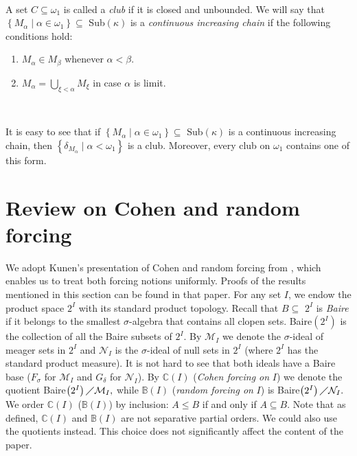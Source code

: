 \documentclass{article}%
\begin{document}
\qquad\qquad\qquad\ \ \qquad\ \ 

A set $C\subseteq\omega_{1}$ is called a \emph{club }if it is closed and
unbounded. We will say that $\left\{  M_{\alpha}\mid\alpha\in\omega
_{1}\right\}  \subseteq$ \textsf{Sub}$\left(  \kappa\right)  $ is a
\emph{continuous increasing chain }if the following conditions hold:

\begin{enumerate}
\item $M_{\alpha}\in M_{\beta}$ whenever $\alpha<\beta.$

\item $M_{\alpha}=\bigcup\limits_{\xi<\alpha}M_{\xi}$ in case $\alpha$ is limit.
\end{enumerate}

\qquad\ \qquad\ \ \ \ \qquad\qquad\qquad\ \ \qquad\qquad\ \ 

It is easy to see that if $\left\{  M_{\alpha}\mid\alpha\in\omega_{1}\right\}
\subseteq$ \textsf{Sub}$\left(  \kappa\right)  $ is a continuous increasing
chain, then $\left\{  \delta_{M_{\alpha}}\mid\alpha<\omega_{1}\right\}  $ is a
club. Moreover, every club on $\omega_{1}$ contains one of this form.

\section{Review on Cohen and random forcing}

We adopt Kunen's presentation of Cohen and random forcing from
\cite{KunenCohenyRandom}, which enables us to treat both forcing notions
uniformly. Proofs of the results mentioned in this section can be found in
that paper. For any set $I$, we endow the product space $2^{I}$ with its
standard product topology. Recall that $B\subseteq$ $2^{I}$ is \emph{Baire} if
it belongs to the smallest $\sigma$-algebra that contains all clopen sets.
\textsf{Baire}$\left(  2^{I}\right)  $ is the collection of all the Baire
subsets of $2^{I}.$ By $\mathcal{M}_{I}$ we denote the $\sigma$-ideal of
meager sets in $2^{I}$ and $\mathcal{N}_{I}$ is the $\sigma$-ideal of null
sets in $2^{I}$ (where $2^{I}$ has the standard product measure). It is not
hard to see that both ideals have a Baire base ($F_{\sigma}$ for
$\mathcal{M}_{I}$ and $G_{\delta}$ for $\mathcal{N}_{I}$). By $\mathbb{C}%
\left(  I\right)  $ (\emph{Cohen forcing on} $I$) we denote the quotient
\textsf{Baire}$\left(  2^{I}\right)  \diagup\mathcal{M}_{I},$ while
$\mathbb{B}\left(  I\right)  $ (\emph{random forcing on} $I$) is
\textsf{Baire}$\left(  2^{I}\right)  \diagup\mathcal{N}_{I}.$ We order
$\mathbb{C}\left(  I\right)  $ ($\mathbb{B}\left(  I\right)  $) by inclusion:
$A\leq B$ if and only if $A\subseteq B$. Note that as defined, $\mathbb{C}%
\left(  I\right)  $ and $\mathbb{B}\left(  I\right)  $ are not separative
partial orders. We could also use the quotients instead. This choice does not
significantly affect the content of the paper.
\end{document}
